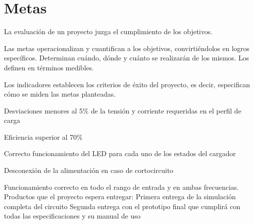 \section{Metas}

La evaluación de un proyecto juzga el cumplimiento de los objetivos. 

Las metas operacionalizan y cuantifican a los objetivos, convirtiéndolos en logros específicos.
Determinan cuándo, dónde y cuánto se realizarán de los mismos. Los definen en términos medibles.





Los indicadores establecen los criterios de éxito del proyecto, es decir, especifican cómo se miden las metas planteadas. 
\item Desviaciones menores al 5\% de la tensión y corriente requeridas en el perfil de carga 
\item Eficiencia superior al 70\%
\item Correcto funcionamiento del LED para cada uno de los estados del cargador
\item Desconexión de la alimentación en caso de cortocircuito
\item %
\item Funcionamiento correcto en todo el rango de entrada y en ambas frecuencias. 
Productos que el proyecto espera entregar:
Primera entrega de la simulación completa del circuito
Segunda entrega con el prototipo final que cumplirá con todas las especificaciones y su manual de uso
